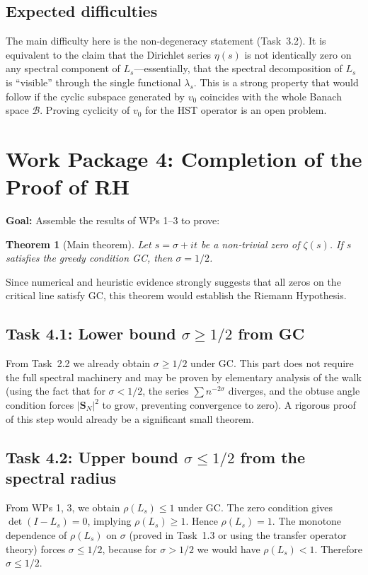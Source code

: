 \documentclass[11pt,a4paper]{article}
\newtheorem{theorem}{Theorem}[section]
\begin{document}
\subsection{Expected difficulties}
The main difficulty here is the non‑degeneracy statement (Task~3.2).  It is equivalent to the claim that the Dirichlet series $\eta(s)$ is not identically zero on any spectral component of $L_s$—essentially, that the spectral decomposition of $L_s$ is ``visible'' through the single functional $\lambda_s$.  This is a strong property that would follow if the cyclic subspace generated by $v_0$ coincides with the whole Banach space $\mathcal{B}$.  Proving cyclicity of $v_0$ for the HST operator is an open problem.

\section{Work Package 4: Completion of the Proof of RH}

\textbf{Goal:}  Assemble the results of WPs 1–3 to prove:

\begin{theorem}[Main theorem]
Let $s = \sigma + it$ be a non‑trivial zero of $\zeta(s)$.  If $s$ satisfies the greedy condition GC, then $\sigma = 1/2$.
\end{theorem}

Since numerical and heuristic evidence strongly suggests that all zeros on the critical line satisfy GC, this theorem would establish the Riemann Hypothesis.

\subsection{Task 4.1: Lower bound $\sigma \ge 1/2$ from GC}
From Task~2.2 we already obtain $\sigma \ge 1/2$ under GC.  This part does not require the full spectral machinery and may be proven by elementary analysis of the walk (using the fact that for $\sigma < 1/2$, the series $\sum n^{-2\sigma}$ diverges, and the obtuse angle condition forces $|\mathbf{S}_N|^2$ to grow, preventing convergence to zero).  A rigorous proof of this step would already be a significant small theorem.

\subsection{Task 4.2: Upper bound $\sigma \le 1/2$ from the spectral radius}
From WPs 1, 3, we obtain $\rho(L_s) \le 1$ under GC.  The zero condition gives $\det(I-L_s)=0$, implying $\rho(L_s) \ge 1$.  Hence $\rho(L_s) = 1$.  The monotone dependence of $\rho(L_s)$ on $\sigma$ (proved in Task~1.3 or using the transfer operator theory) forces $\sigma \le 1/2$, because for $\sigma > 1/2$ we would have $\rho(L_s) < 1$.  Therefore $\sigma \le 1/2$.
\end{document}
